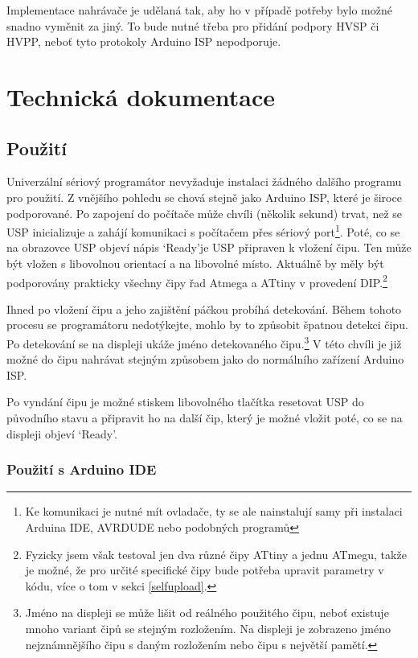 \documentclass[11pt,a4paper,twoside,openright]{report}
\begin{document}
Implementace nahrávače je udělaná tak, aby ho v případě potřeby bylo možné snadno vyměnit za jiný. To bude nutné třeba pro přidání podpory HVSP či HVPP, neboť tyto protokoly Arduino ISP nepodporuje.

\chapter{Technická dokumentace}

\section {Použití}

Univerzální sériový programátor nevyžaduje instalaci žádného dalšího programu pro použití. Z vnějšího pohledu se chová stejně jako Arduino ISP, které je široce podporované. Po zapojení do počítače může chvíli (několik sekund) trvat, než se USP inicializuje a zahájí komunikaci s počítačem přes sériový port\footnote{Ke komunikaci je nutné mít ovladače, ty se ale nainstalují samy při instalaci Arduina IDE, AVRDUDE nebo podobných programů}. Poté, co se na obrazovce USP objeví nápis \lq Ready\rq  je USP připraven k vložení čipu. Ten může být vložen s libovolnou orientací a na libovolné místo. Aktuálně by měly být podporovány prakticky všechny čipy řad Atmega a ATtiny v provedení DIP.\footnote{Fyzicky jsem však testoval jen dva různé čipy ATtiny a jednu ATmegu, takže je možné, že pro určité specifické čipy bude potřeba upravit parametry v kódu, více o tom v sekci \ref{selfupload}.} 

Ihned po vložení čipu a jeho zajištění páčkou probíhá detekování. Během tohoto procesu se programátoru nedotýkejte, mohlo by to způsobit špatnou detekci čipu. Po detekování se na displeji ukáže jméno detekovaného čipu.\footnote{Jméno na displeji se může lišit od reálného použitého čipu, neboť existuje mnoho variant čipů se stejným rozložením. Na displeji je zobrazeno jméno nejznámnějšího čipu s daným rozložením nebo čipu s největší pamětí.} V této chvíli je již možné do čipu nahrávat stejným způsobem jako do normálního zařízení Arduino ISP.

Po vyndání čipu je možné stiskem libovolného tlačítka resetovat USP do původního stavu a připravit ho na další čip, který je možné vložit poté, co se na displeji objeví \lq Ready\rq .

\subsection {Použití s Arduino IDE}
\end{document}
